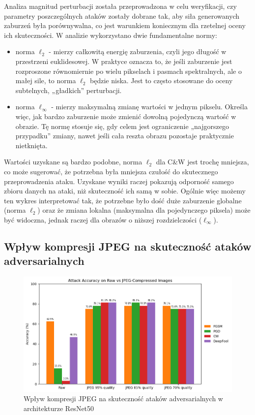 \documentclass[12pt]{article}
\begin{document}
Analiza magnitud perturbacji została przeprowadzona w celu weryfikacji, czy parametry poszczególnych ataków zostały dobrane tak, aby siła generowanych zaburzeń była porównywalna, co jest warunkiem koniecznym dla rzetelnej oceny ich skuteczności. W analizie wykorzystano dwie fundamentalne normy:
\begin{itemize}
    \item norma $\ell_2$ - mierzy całkowitą energię zaburzenia, czyli jego długość w przestrzeni euklidesowej. W praktyce oznacza to, że jeśli zaburzenie jest rozproszone równomiernie po wielu pikselach i pasmach spektralnych, ale o małej sile, to norma $\ell_2$ będzie niska. Jest to często stosowane do oceny subtelnych, „gładkich” perturbacji.
    \item norma $\ell_\infty$ - mierzy maksymalną zmianę wartości w jednym pikselu. Określa więc, jak bardzo zaburzenie może zmienić dowolną pojedynczą wartość w obrazie. Tę normę stosuje się, gdy celem jest ograniczenie „najgorszego przypadku” zmiany, nawet jeśli cała reszta obrazu pozostaje praktycznie nietknięta.
\end{itemize}
Wartości uzyskane są bardzo podobne, norma $\ell_2$ dla C\&W jest trochę mniejsza, co może sugerować, że potrzebna była mniejsza czułość do skutecznego przeprowadzenia ataku. Uzyskane wyniki raczej pokazują odporność samego zbioru danych na ataki, niż skuteczność ich samą w sobie. Ogólnie więc możemy ten wykres interpretować tak, że potrzebne było dość duże zaburzenie globalne (norma $\ell_2$) oraz że zmiana lokalna (maksymalna dla pojedynczego piksela) może być widoczna, jednak raczej dla obrazów o niższej rozdzielczości ($\ell_\infty$).

\subsection{Wpływ kompresji JPEG na skuteczność ataków adversarialnych}

\begin{figure}[H]
    \centering
    \includegraphics[width=1\textwidth]{jpeg_accuracy.png}
    \caption{Wpływ kompresji JPEG na skuteczność ataków adversarialnych w architekturze ResNet50}
    \label{fig:jpeg-compression}
\end{figure}
\end{document}
